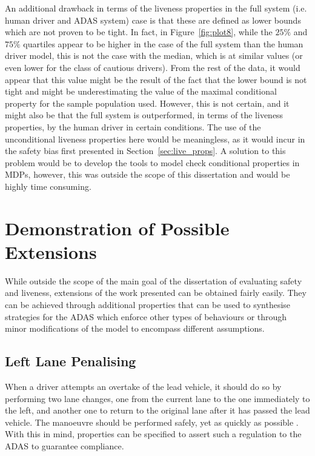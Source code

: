 An additional drawback in terms of the liveness properties in the full system (i.e. human driver and ADAS system) case is that these are defined as lower bounds which are not proven to be tight. In fact, in Figure~\ref{fig:plot8}, while the $25\%$ and $75\%$ quartiles appear to be higher in the case of the full system than the human driver model, this is not the case with the median, which is at similar values (or even lower for the class of cautious drivers). From the rest of the data, it would appear that this value might be the result of the fact that the lower bound is not tight and might be underestimating the value of the maximal conditional property for the sample population used. However, this is not certain, and it might also be that the full system is outperformed, in terms of the liveness properties, by the human driver in certain conditions. The use of the unconditional liveness properties here would be meaningless, as it would incur in the safety bias first presented in Section~\ref{sec:live_props}. A solution to this problem would be to develop the tools to model check conditional properties in MDPs, however, this was outside the scope of this dissertation and would be highly time consuming.

\section{Demonstration of Possible Extensions}
\label{sec:add_exp}

While outside the scope of the main goal of the dissertation of evaluating safety and liveness, extensions of the work presented can be obtained fairly easily. They can be achieved through additional properties that can be used to synthesise strategies for the ADAS which enforce other types of behaviours or through minor modifications of the model to encompass different assumptions.

\subsection{Left Lane Penalising}

When a driver attempts an overtake of the lead vehicle, it should do so by performing two lane changes, one from the current lane to the one immediately to the left, and another one to return to the original lane after it has passed the lead vehicle. The manoeuvre should be performed safely, yet as quickly as possible \cite{carr}. With this in mind, properties can be specified to assert such a regulation to the ADAS to guarantee compliance.

